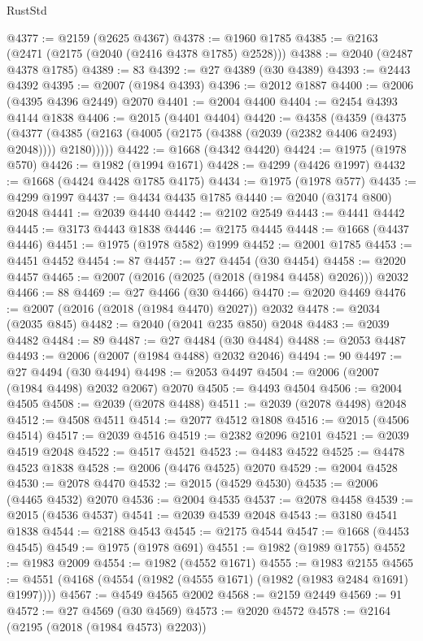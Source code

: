 \begin{lexlean}{RustStd}
\begin{coremodule}
@4377 := @2159 (@2625 @4367)
@4378 := @1960 @1785
@4385 := @2163 (@2471 (@2175 (@2040 (@2416 @4378 @1785) @2528)))
@4388 := @2040 (@2487 @4378 @1785)
@4389 := 83
@4392 := @27 @4389 (@30 @4389)
@4393 := @2443 @4392
@4395 := @2007 (@1984 @4393)
@4396 := @2012 @1887
@4400 := @2006 (@4395 @4396 @2449) @2070
@4401 := @2004 @4400
@4404 := @2454 @4393 @4144 @1838
@4406 := @2015 (@4401 @4404)
@4420 := @4358
    (@4359
      (@4375
        (@4377 (@4385 (@2163 (@4005 (@2175 (@4388 (@2039 (@2382 @4406 @2493) @2048)))) @2180)))))
@4422 := @1668 (@4342 @4420)
@4424 := @1975 (@1978 @570)
@4426 := @1982 (@1994 @1671)
@4428 := @4299 (@4426 @1997)
@4432 := @1668 (@4424 @4428 @1785 @4175)
@4434 := @1975 (@1978 @577)
@4435 := @4299 @1997
@4437 := @4434 @4435 @1785
@4440 := @2040 (@3174 @800) @2048
@4441 := @2039 @4440
@4442 := @2102 @2549
@4443 := @4441 @4442
@4445 := @3173 @4443 @1838
@4446 := @2175 @4445
@4448 := @1668 (@4437 @4446)
@4451 := @1975 (@1978 @582) @1999
@4452 := @2001 @1785
@4453 := @4451 @4452
@4454 := 87
@4457 := @27 @4454 (@30 @4454)
@4458 := @2020 @4457
@4465 := @2007 (@2016 (@2025 (@2018 (@1984 @4458) @2026))) @2032
@4466 := 88
@4469 := @27 @4466 (@30 @4466)
@4470 := @2020 @4469
@4476 := @2007 (@2016 (@2018 (@1984 @4470) @2027)) @2032
@4478 := @2034 (@2035 @845)
@4482 := @2040 (@2041 @235 @850) @2048
@4483 := @2039 @4482
@4484 := 89
@4487 := @27 @4484 (@30 @4484)
@4488 := @2053 @4487
@4493 := @2006 (@2007 (@1984 @4488) @2032 @2046)
@4494 := 90
@4497 := @27 @4494 (@30 @4494)
@4498 := @2053 @4497
@4504 := @2006 (@2007 (@1984 @4498) @2032 @2067) @2070
@4505 := @4493 @4504
@4506 := @2004 @4505
@4508 := @2039 (@2078 @4488)
@4511 := @2039 (@2078 @4498) @2048
@4512 := @4508 @4511
@4514 := @2077 @4512 @1808
@4516 := @2015 (@4506 @4514)
@4517 := @2039 @4516
@4519 := @2382 @2096 @2101
@4521 := @2039 @4519 @2048
@4522 := @4517 @4521
@4523 := @4483 @4522
@4525 := @4478 @4523 @1838
@4528 := @2006 (@4476 @4525) @2070
@4529 := @2004 @4528
@4530 := @2078 @4470
@4532 := @2015 (@4529 @4530)
@4535 := @2006 (@4465 @4532) @2070
@4536 := @2004 @4535
@4537 := @2078 @4458
@4539 := @2015 (@4536 @4537)
@4541 := @2039 @4539 @2048
@4543 := @3180 @4541 @1838
@4544 := @2188 @4543
@4545 := @2175 @4544
@4547 := @1668 (@4453 @4545)
@4549 := @1975 (@1978 @691)
@4551 := @1982 (@1989 @1755)
@4552 := @1983 @2009
@4554 := @1982 (@4552 @1671)
@4555 := @1983 @2155
@4565 := @4551 (@4168 (@4554 (@1982 (@4555 @1671) (@1982 (@1983 @2484 @1691) @1997))))
@4567 := @4549 @4565 @2002
@4568 := @2159 @2449
@4569 := 91
@4572 := @27 @4569 (@30 @4569)
@4573 := @2020 @4572
@4578 := @2164 (@2195 (@2018 (@1984 @4573) @2203))

\end{coremodule}
\end{lexlean}
